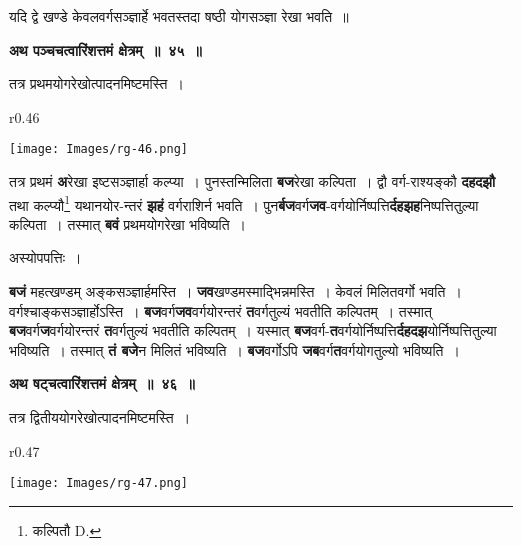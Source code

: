 \documentclass[11pt, openany]{book}
\begin{document}
 यदि द्वे खण्डे केवलवर्गसञ्ज्ञार्हे भवतस्तदा षष्ठी योगसञ्ज्ञा रेखा भवति~॥ 
\vspace{2mm}

\begin{center}
\textbf{\large अथ पञ्चचत्वारिंशत्तमं क्षेत्रम्~॥~४५~॥}
\end{center}

{\ab तत्र प्रथमयोगरेखोत्पादनमिष्टमस्ति~। }\\

\begin{wrapfigure}{r}{0.46\textwidth}
\vspace{-8mm}
\begin{center}
\texttt{[image: Images/rg-46.png]}
\end{center}
\vspace{-8mm}
\end{wrapfigure}

 तत्र प्रथमं \textbf{अ}रेखा इष्टसञ्ज्ञार्हा कल्प्या~। पुनस्तन्मिलिता \textbf{बज}रेखा कल्पिता~। द्वौ वर्ग-राश्यङ्कौ \textbf{दहदझौ} तथा कल्प्यौ\renewcommand{\thefootnote}{१}\footnote{कल्पितौ {\en D.}} यथानयोर-न्तरं \textbf{झहं} वर्गराशिर्न भवति~। पुन\textbf{र्बज}वर्ग\textbf{जव}-वर्गयोर्निष्पत्ति\textbf{र्दहझह}निष्पत्तितुल्या कल्पिता~। तस्मात् \textbf{बवं} प्रथमयोगरेखा भविष्यति~। 
 
\begin{center}
अस्योपपत्तिः~।
\end{center}

 \textbf{बजं} महत्खण्डम् अङ्कसञ्ज्ञार्हमस्ति~। \textbf{जव}खण्डमस्माद्भिन्नमस्ति~। केवलं मिलितवर्गो भवति~। वर्गश्चाङ्कसञ्ज्ञार्होऽस्ति~। \textbf{बज}वर्ग\textbf{जव}वर्गयोरन्तरं \textbf{त}वर्गतुल्यं भवतीति कल्पितम्~। तस्मात् \textbf{बज}वर्ग\textbf{ज}वर्गयोरन्तरं \textbf{त}वर्गतुल्यं भवतीति कल्पितम्~। यस्मात् \textbf{बज}वर्ग-\textbf{त}वर्गयोर्निष्पत्ति\textbf{र्दहदझ}योर्निष्पत्तितुल्या भविष्यति~। तस्मात् \textbf{तं बजे}न मिलितं भविष्यति~। \textbf{बज}वर्गोऽपि \textbf{जब}वर्ग\textbf{त}वर्गयोगतुल्यो भविष्यति~। 
\vspace{2mm}

\begin{center}
\textbf{\large अथ षट्चत्वारिंशत्तमं क्षेत्रम्~॥~४६~॥}
\end{center}

{\ab तत्र द्वितीययोगरेखोत्पादनमिष्टमस्ति~। }\\

\begin{wrapfigure}{r}{0.47\textwidth}
\vspace{-12mm}
\begin{center}
\texttt{[image: Images/rg-47.png]}
\end{center}
\vspace{-8mm}
\end{wrapfigure}
\end{document}
